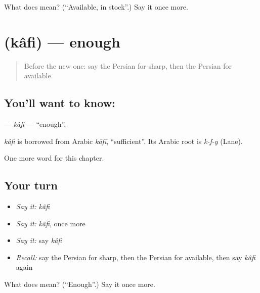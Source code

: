 \begin{tcolorbox}[breakable,colback=teal!4,colframe=teal!35!black,title={Before you move on}]
What does  mean? (\textquotedblleft{}Available, in stock\textquotedblright{}.) Say it once more.
\end{tcolorbox}
\section[\texorpdfstring{\fa{کافی} (kâfi)}{کافی (kâfi)}]{ (kâfi) — enough}

\label{lesson:FA-C235-kafi}



\begin{quote}
Before the new one: say the Persian for sharp, then the Persian for available.
\end{quote}

\subsection*{You'll want to know: }
\textbf{} — \emph{kâfi} — \textquotedblleft{}enough\textquotedblright{}.

\begin{cousinweb}
\emph{kâfi} is borrowed from Arabic \emph{kāfī}, \textquotedblleft{}sufficient\textquotedblright{}. Its Arabic root is \emph{k-f-y} (Lane).
\end{cousinweb}

\begin{grammarlens}[title={What you've built}]
One more word for this chapter.
\end{grammarlens}

\subsection*{Your turn}
\begin{itemize}
\raggedright
  \item \emph{Say it:} \emph{kâfi}
  \item \emph{Say it:} \emph{kâfi}, once more
  \item \emph{Say it:} say \emph{kâfi}
  \item \emph{Recall:} say the Persian for sharp, then the Persian for available, then say \emph{kâfi} again
\end{itemize}

\begin{tcolorbox}[breakable,colback=teal!4,colframe=teal!35!black,title={Before you move on}]
What does  mean? (\textquotedblleft{}Enough\textquotedblright{}.) Say it once more.
\end{tcolorbox}
